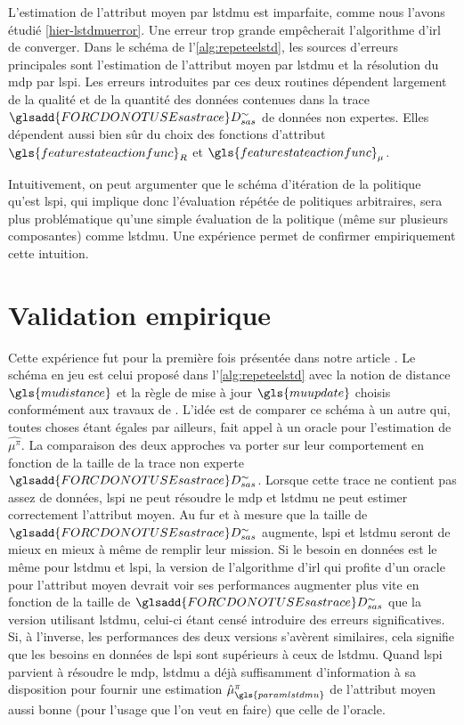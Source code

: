\documentclass[frenchb,a4paper,justified,notoc]{tufte-book}
\newcommand{\mudistance}{\gls{mudistance}}
\newcommand{\paramlstdmu}{\gls{paramlstdmu}}
\newcommand{\muupdate}{\gls{muupdate}}
\newcommand{\featurestateactionfunc}{\gls{featurestateactionfunc}}
\newcommand{\sastrace}[1]{\ensuremath{\glsadd{FORCDONOTUSEsastrace}D_{sas}^{#1}}}
\begin{document}
L'estimation de l'attribut moyen par \gls{lstdmu} est imparfaite, comme nous l'avons étudié \autoref{hier-lstdmuerror}. Une erreur trop grande empêcherait l'algorithme d'\gls{irl} de converger. Dans le schéma de l'\autoref{alg:repeteelstd}, les sources d'erreurs principales sont l'estimation de l'attribut moyen par \gls{lstdmu} et la résolution du \gls{mdp} par \gls{lspi}. Les erreurs introduites par ces deux routines dépendent largement de la qualité et de la quantité des données contenues dans la trace $\sastrace{\sim}$ de données non expertes. Elles dépendent aussi bien sûr du choix des fonctions d'attribut $\featurestateactionfunc_R$ et $\featurestateactionfunc_\mu$. 

Intuitivement, on peut argumenter que le schéma d'itération de la politique qu'est \gls{lspi}, qui implique donc l'évaluation répétée de politiques arbitraires, sera plus problématique qu'une simple évaluation de la politique (même sur plusieurs composantes) comme \gls{lstdmu}. Une expérience permet de confirmer empiriquement cette intuition.
\section{Validation empirique}
\label{sec-4-4}


Cette expérience fut pour la première fois présentée dans notre article \citep{klein2011batch}. Le schéma en jeu est celui proposé dans l'\autoref{alg:repeteelstd} avec la notion de distance $\mudistance$ et la règle de mise à jour $\muupdate$ choisis conformément aux travaux de \citet{abbeel2004apprenticeship}.
L'idée est de comparer ce schéma à un autre qui, toutes choses étant égales par ailleurs, fait appel à un oracle pour l'estimation de $\hat{\mu^\pi}$. La comparaison des deux approches va porter sur leur comportement en fonction de la taille de la trace non experte $\sastrace{\sim}$. Lorsque cette trace ne contient pas assez de données, \gls{lspi} ne peut résoudre le \gls{mdp} et \gls{lstdmu} ne peut estimer correctement l'attribut moyen. Au fur et à mesure que la taille de $\sastrace{\sim}$ augmente, \gls{lspi} et \gls{lstdmu} seront de mieux en mieux à même de remplir leur mission. Si le besoin en données est le même pour \gls{lstdmu} et \gls{lspi}, la version de l'algorithme d'\gls{irl} qui profite d'un oracle pour l'attribut moyen devrait voir ses performances augmenter plus vite en fonction de la taille de $\sastrace{\sim}$ que la version utilisant \gls{lstdmu}, celui-ci étant censé introduire des erreurs significatives. Si, à l'inverse, les performances des deux versions s'avèrent similaires, cela signifie que les besoins en données de \gls{lspi} sont supérieurs à ceux de \gls{lstdmu}. Quand \gls{lspi} parvient à résoudre le \gls{mdp}, \gls{lstdmu} a déjà suffisamment d'information à sa disposition pour fournir une estimation $\hat\mu^\pi_{\paramlstdmu}$ de l'attribut moyen aussi bonne (pour l'usage que l'on veut en faire) que celle de l'oracle.
\end{document}

